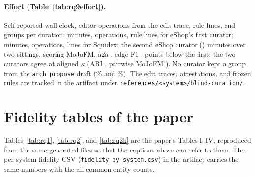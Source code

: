 \documentclass[10pt,conference]{IEEEtran}
\newcommand{\cli}{\texttt{arch}}
\newcommand{\cli}{\texttt{arch}}
\begin{document}
\paragraph{Effort (Table~\ref{tab:rq9effort}).} Self-reported wall-clock, editor operations from
the edit trace, rule lines, and groups per curation: \rqNineEshopMinutes{} minutes,
\rqNineEshopOps{} operations, \rqNineEshopRuleLines{} rule lines for eShop's first curator;
\rqNineSquidexMinutes{} minutes, \rqNineSquidexOps{} operations, \rqNineSquidexRuleLines{} lines
for Squidex; the second eShop curator (\rqNineEshopSecondCuratorCode{})
\rqNineEshopSecondCuratorMinutes{} minutes over two sittings, scoring
\rqNineEshopSecondCuratorMoJo{} MoJoFM, a2a \rqNineEshopSecondCuratorAtoA{}, edge-F1
\rqNineEshopSecondCuratorEdgeFone{}, \rqNineEshopCuratorMoJoSpread{} points below the first; the
two curators agree at aligned $\kappa$ \rqNineEshopCuratorPairKappaAligned{} (ARI
\rqNineEshopCuratorPairAri{}, pairwise MoJoFM \rqNineEshopCuratorPairMoJo{}). No curator kept a
group from the \cli~\texttt{propose} draft (\rqNineEshopProposeDerivedPct\% and
\rqNineSquidexProposeDerivedPct\%). The edit traces, attestations, and frozen rules are tracked in
the artifact under \texttt{references/<system>/blind-curation/}.

\section{Fidelity tables of the paper}
\label{sec:papertables}




Tables~\ref{tab:rq1}, \ref{tab:rq2}, and \ref{tab:rq2k} are the paper's Tables I--IV, reproduced
from the same generated files so that the captions above can refer to them. The per-system
fidelity CSV (\texttt{fidelity-by-system.csv}) in the artifact carries the same numbers with the
all-common entity counts.



\end{document}
